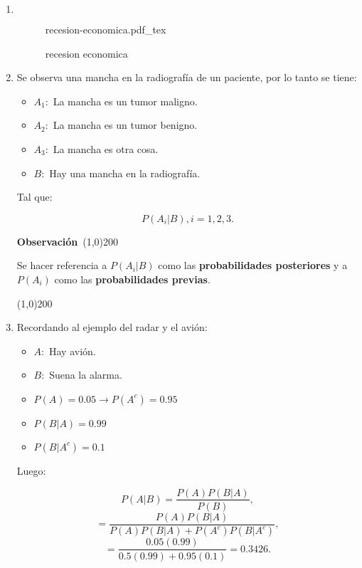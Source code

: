 \documentclass[a4paper]{book}
\newcommand{\incfig}[2][0.7]{%
    \def\svgwidth{#1\columnwidth}
    {#2.pdf_tex}
}
\newenvironment{obs}
    {
        \begin{flushleft}
       \textbf{Observación}\
        \line(1,0){200} \
        \end{flushleft}
    }
    {
        \begin{flushright}
        \line(1,0){200}
        \end{flushright}
    }
\begin{document}
\begin{enumerate}[{Ej 1: }]
    \item \( \)
\begin{figure}[ht]
    \centering
    \incfig{recesion-economica}
    \caption{recesion economica}
    \label{fig:recesion-economica}
\end{figure}

    \item Se observa una mancha en la radiografía de un paciente, por lo tanto se tiene:
        \begin{itemize}
            \item \(A_1:\) La mancha es un tumor maligno.
            \item \(A_2:\) La mancha es un tumor benigno.
            \item \(A_3:\) La mancha es otra cosa.
            \item \(B:\) Hay una mancha en la radiografía.
        \end{itemize}

        Tal que:

        \[
        P\left( A_{i}|B \right) , i=1,2,3
        .\]
        \begin{obs}
            Se hacer referencia a \(P\left(A_{i}|B\right)\) como las
            \textbf{probabilidades posteriores} y a \(P\left(A_{i}\right)\)
            como las \textbf{probabilidades previas}.
        \end{obs}

    \item Recordando al ejemplo del radar y el avión:
        \begin{itemize}
            \item \(A:\) Hay avión.
            \item \(B:\) Suena la alarma.
        \end{itemize}

        \begin{itemize}
            \item \(P\left(A\right)=0.05\to P\left(A^{c}\right)=0.95\)
            \item \(P\left(B|A\right)=0.99\)
            \item \(P\left(B|A^{c}\right)=0.1\)
        \end{itemize}

        Luego:

        \[
        P\left(A|B\right) = \frac{P\left(A\right)P\left(B|A\right)}{P\left(B\right)}
    ,\]
    \[
    = \frac{P\left(A\right)P\left(B|A \right)}{P\left(A \right)P\left(B|A\right)+P\left(A^{c}\right)P\left(B|A^{c}\right)}
    ,\]
    \[
        =\frac{0.05\left(0.99\right)}{0.5\left(0.99\right)+0.95\left(0.1\right)}=0.3426
    .\]


\end{enumerate}
\end{document}
